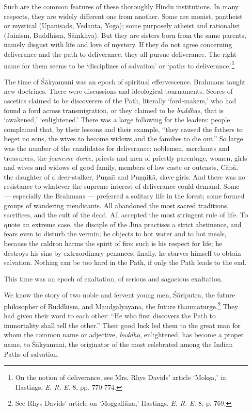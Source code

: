 \documentclass[a4paper, 11pt, oneside, english, landscape]{article}
\begin{document}
Such are the common features of these thoroughly Hindu institutions. In many respects, they are widely different one from another. Some are monist, pantheist or mystical (Upaniṣads, Vedānta, Yoga); some purposely atheist and rationalist (Jainism, Buddhism, Sāṃkhya). But they are sisters born from the same parents, namely disgust with life and love of mystery. If they do not agree concerning deliverance and the path to deliverance, they all pursue deliverance. The right name for them seems to be `disciplines of salvation' or `paths to deliverance.'\footnote{On the notion of deliverance, see Mrs. Rhys Davids' article `Mokṣa,' in Hastings, \emph{E. R. E.} 8, pp. 770-774.}

The time of Śākyamuni was an epoch of spiritual effervescence. Brahmans taught new doctrines. There were discussions and ideological tournaments. Scores of ascetics claimed to be discoverers of the Path, literally `ford-makers,' who had found a ford across transmigration, or they claimed to be \emph{buddhas}, that is `awakened,' `enlightened.' There was a large following for the leaders: people complained that, by their lessons and their example, ``they caused the fathers to beget no sons, the wives to become widows and the families to die out.'' So large was the number of the candidates for deliverance: noblemen, merchants and treasurers, the \emph{jeunesse dorée}, priests and men of priestly parentage, women, girls and wives and widows of good family, members of low caste or outcasts, Cāpā, the daughter of a deer-stalker, Puṇnā and Puṇṇikā, slave girls. And there was no resistance to whatever the supreme interest of deliverance could demand. Some --- especially the Brahmans --- preferred a solitary life in the forest; some formed groups of wandering mendicants. All abandoned the most sacred traditions, sacrifices, and the cult of the dead. All accepted the most stringent rule of life. To quote an extreme case, the disciple of the Jina practises a strict abstinence, and fears even to disturb the vermin; he objects to hot water and to hot meals, because the caldron harms the spirit of fire: such is his respect for life; he destroys his sins by extraordinary penances; finally, he starves himself to obtain salvation. Nothing can be too hard in the Path, if only the Path leads to the end.

This time was an epoch of exaltation, of serious and sagacious exaltation.

We know the story of two noble and fervent young men, Śāriputra, the future philosopher of Buddhism, and Maudgalyāyana, the future thaumaturge.\footnote{See Rhys Davids' article on `Moggallāna,' Hastings, \emph{E. R. E.} 8, p. 769.} They had given their word to each other: ``He who first discovers the Path to immortality shall tell the other.'' Their good luck led them to the great man for whom the common name or adjective, \emph{buddha}, enlightened, has become a proper name, to Śākyamuni, the originator of the most celebrated among the Indian Paths of salvation.
\end{document}
